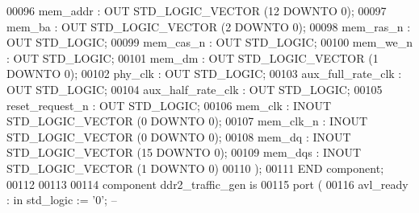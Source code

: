 \begin{DoxyCode}
00096         mem_addr                : \textcolor{keywordflow}{OUT} \textcolor{comment}{STD\_LOGIC\_VECTOR} (\textcolor{vhdllogic}{}\textcolor{vhdllogic}{12} \textcolor{keywordflow}{DOWNTO} \textcolor{vhdllogic}{}\textcolor{vhdllogic}{0});
00097         mem_ba              : \textcolor{keywordflow}{OUT} \textcolor{comment}{STD\_LOGIC\_VECTOR} (\textcolor{vhdllogic}{}\textcolor{vhdllogic}{2} \textcolor{keywordflow}{DOWNTO} \textcolor{vhdllogic}{}\textcolor{vhdllogic}{0});
00098         mem_ras_n           : \textcolor{keywordflow}{OUT} \textcolor{comment}{STD\_LOGIC};
00099         mem_cas_n           : \textcolor{keywordflow}{OUT} \textcolor{comment}{STD\_LOGIC};
00100         mem_we_n                : \textcolor{keywordflow}{OUT} \textcolor{comment}{STD\_LOGIC};
00101         mem_dm              : \textcolor{keywordflow}{OUT} \textcolor{comment}{STD\_LOGIC\_VECTOR} (\textcolor{vhdllogic}{}\textcolor{vhdllogic}{1} \textcolor{keywordflow}{DOWNTO} \textcolor{vhdllogic}{}\textcolor{vhdllogic}{0});
00102         phy_clk             : \textcolor{keywordflow}{OUT} \textcolor{comment}{STD\_LOGIC};
00103         aux_full_rate_clk   : \textcolor{keywordflow}{OUT} \textcolor{comment}{STD\_LOGIC};
00104         aux_half_rate_clk   : \textcolor{keywordflow}{OUT} \textcolor{comment}{STD\_LOGIC};
00105         reset_request_n : \textcolor{keywordflow}{OUT} \textcolor{comment}{STD\_LOGIC};
00106         mem_clk             : \textcolor{keywordflow}{INOUT} \textcolor{comment}{STD\_LOGIC\_VECTOR} (\textcolor{vhdllogic}{}\textcolor{vhdllogic}{0} \textcolor{keywordflow}{DOWNTO} \textcolor{vhdllogic}{}\textcolor{vhdllogic}{0});
00107         mem_clk_n           : \textcolor{keywordflow}{INOUT} \textcolor{comment}{STD\_LOGIC\_VECTOR} (\textcolor{vhdllogic}{}\textcolor{vhdllogic}{0} \textcolor{keywordflow}{DOWNTO} \textcolor{vhdllogic}{}\textcolor{vhdllogic}{0});
00108         mem_dq              : \textcolor{keywordflow}{INOUT} \textcolor{comment}{STD\_LOGIC\_VECTOR} (\textcolor{vhdllogic}{}\textcolor{vhdllogic}{15} \textcolor{keywordflow}{DOWNTO} \textcolor{vhdllogic}{}\textcolor{vhdllogic}{0});
00109         mem_dqs             : \textcolor{keywordflow}{INOUT} \textcolor{comment}{STD\_LOGIC\_VECTOR} (\textcolor{vhdllogic}{}\textcolor{vhdllogic}{1} \textcolor{keywordflow}{DOWNTO} \textcolor{vhdllogic}{}\textcolor{vhdllogic}{0})
00110     );
00111 \textcolor{keywordflow}{END} \textcolor{keywordflow}{component};
00112 
00113 
00114 \textcolor{keywordflow}{component} ddr2\_traffic\_gen \textcolor{keywordflow}{is}
00115     \textcolor{keywordflow}{port} (
00116         avl\_ready           : \textcolor{keywordflow}{in}  \textcolor{comment}{std\_logic}                     := '\textcolor{vhdllogic}{}\textcolor{vhdllogic}{0}';             \textcolor{keyword}{--      
}
\end{DoxyCode}
